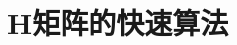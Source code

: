 

\section{H矩阵的快速算法}
\cite{lin2011fast,brunner2010comparison,borm2010efficient}
\putbib[20130104H-matrix]
\newpage
